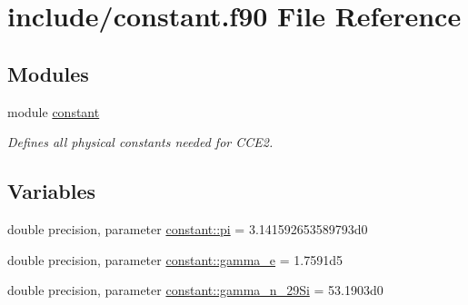 \hypertarget{constant_8f90}{
\section{include/constant.f90 File Reference}
\label{constant_8f90}
}
\subsection*{Modules}
\begin{DoxyCompactItemize}
\item 
module \hyperlink{namespaceconstant}{constant}


\begin{DoxyCompactList}\small\item\em Defines all physical constants needed for CCE2. \item\end{DoxyCompactList}\end{DoxyCompactItemize}
\subsection*{Variables}
\begin{DoxyCompactItemize}
\item 
double precision, parameter \hyperlink{namespaceconstant_ae6f370ef8cc1a7c38a6ddf8505ac480d}{constant::pi} = 3.141592653589793d0
\item 
double precision, parameter \hyperlink{namespaceconstant_ad70145ef05b91abf89de0761cb859778}{constant::gamma\_\-e} = 1.7591d5
\item 
double precision, parameter \hyperlink{namespaceconstant_aed9a4589c9352f948ca62e1499046b8c}{constant::gamma\_\-n\_\-29Si} = 53.1903d0
\end{DoxyCompactItemize}
